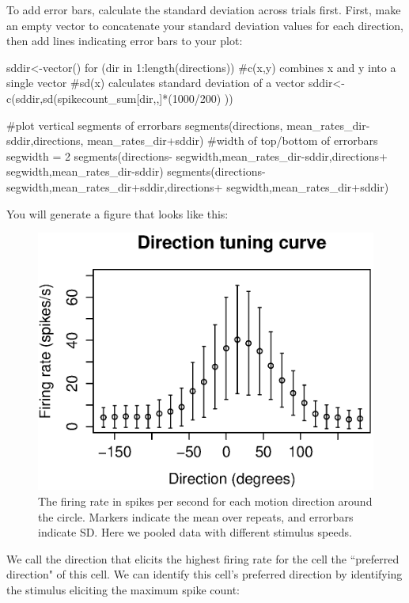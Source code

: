 \documentclass[
letterpaper, %
11pt, %
 oneside, 
onecolumn, %
]{memoir}
\numberwithin{Exercise}{chapter}
\begin{document}
To add error bars, calculate the standard deviation across trials first. First, make an empty vector to concatenate your standard deviation values for each direction, then add lines indicating error bars to your plot:

\begin{shortrcode}
sddir<-vector()
for (dir in 1:length(directions)){
#c(x,y) combines x and y into a single vector
#sd(x) calculates standard deviation of a vector
  sddir<-c(sddir,sd(spikecount_sum[dir,,]*(1000/200) ))
}

#plot vertical segments of errorbars
segments(directions, mean_rates_dir-sddir,directions, mean_rates_dir+sddir)
#width of top/bottom of errorbars
segwidth = 2
segments(directions- segwidth,mean_rates_dir-sddir,directions+ segwidth,mean_rates_dir-sddir)
segments(directions- segwidth,mean_rates_dir+sddir,directions+ segwidth,mean_rates_dir+sddir)
\end{shortrcode}   

You will generate a figure that looks like this:

\begin{figure}[!ht]
\centering
\includegraphics[scale=0.7]{dirtune_wEB} 
\caption{ The firing rate in spikes per second for each motion direction around the circle. Markers indicate the mean over repeats, and errorbars indicate SD. Here we pooled data with different stimulus speeds.} 
\end{figure}
 
We call the direction that elicits the highest firing rate for the cell the ``preferred direction" of this cell.  We can identify this cell's preferred direction by identifying the stimulus eliciting the maximum spike count:
\end{document}
